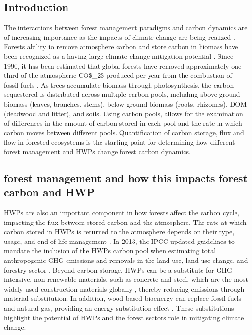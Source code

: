 \documentclass[preprint,12pt,authoryear]{elsarticle}
\begin{document}
\begin{linenumbers}

\section{Introduction}
\label{sec:introduction}
The interactions between  forest management paradigms and carbon dynamics are of increasing importance as the impacts of climate change are being realized \citep{Nabuurs2007Forestry}. Forests ability to remove atmosphere carbon and store carbon in biomass have been recognized as a having large climate change mitigation potential \citep{hurteau2021role}. Since 1990, it has been estimated that global forests have removed approximately one-third of the atmospheric \ac{CO$_2$} produced per year from the combustion of fossil fuels  \citep{pan2011large}. As trees accumulate biomass through photosynthesis, the carbon sequestered is distributed across multiple carbon pools, including above-ground biomass (leaves, branches, stems), below-ground biomass (roots, rhizomes), \ac{DOM}  (deadwood and litter), and soils. Using carbon pools, allows for the examination of differences in the amount of carbon stored in each pool and the rate in which carbon moves between different pools. Quantification of carbon storage, flux and flow in forested ecosystems is the starting point for determining how different forest management and \acp{HWP} change forest carbon dynamics. 

\subsection{forest management and how this impacts forest carbon and HWP}


\acp{HWP} are also an important component in how forests affect the carbon cycle, impacting the flux between stored carbon and the atmosphere. The rate at which carbon stored in \acp{HWP} is returned to the atmosphere depends on their type, usage, and end-of-life management \citep{skog1998carbon}. In 2013, the \ac{IPCC} updated guidelines to mandate the inclusion of the \acp{HWP} carbon pool when estimating total anthropogenic \ac{GHG} emissions and removals in the land-use, land-use change, and forestry sector \citep{hiraishi20142013}. Beyond carbon storage, \acp{HWP} can be a substitute for \ac{GHG}-intensive, non-renewable materials, such as concrete and steel, which are the most widely used construction materials globally \citep{geng2017review}, thereby reducing emissions through material substitution. In addition, wood-based bioenergy can replace fossil fuels and natural gas, providing an energy substitution effect \citep{geng2017review}. These substitutions highlight the potential of \acp{HWP} and the forest sectors role in mitigating climate change.


\end{linenumbers}
\end{document}

